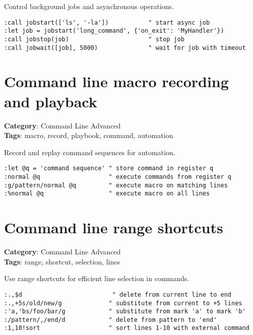 {{{{Control background jobs and asynchronous operations.

\begin{Exa*}{}
\begin{Verbatim}[fontsize=\footnotesize, breaklines, breakanywhere]
:call jobstart(['ls', '-la'])           " start async job
:let job = jobstart('long_command', {'on_exit': 'MyHandler'})
:call jobstop(job)                      " stop job
:call jobwait([job], 5000)              " wait for job with timeout
\end{Verbatim}
\end{Exa*}

\section{Command line macro recording and playback}

\textbf{Category}: Command Line Advanced\\ \textbf{Tags}: macro, record, playbook, command, automation
\vspace{0.5cm}

Record and replay command sequences for automation.

\begin{Exa*}{}
\begin{Verbatim}[fontsize=\footnotesize, breaklines, breakanywhere]
:let @q = 'command sequence' " store command in register q
:normal @q                   " execute commands from register q
:g/pattern/normal @q         " execute macro on matching lines
:%normal @q                  " execute macro on all lines
\end{Verbatim}
\end{Exa*}

\section{Command line range shortcuts}

\textbf{Category}: Command Line Advanced\\ \textbf{Tags}: range, shortcut, selection, lines
\vspace{0.5cm}

Use range shortcuts for efficient line selection in commands.

\begin{Exa*}{}
\begin{Verbatim}[fontsize=\footnotesize, breaklines, breakanywhere]
:.,$d                         " delete from current line to end
:.,+5s/old/new/g             " substitute from current to +5 lines
:'a,'bs/foo/bar/g            " substitute from mark 'a' to mark 'b'
:/pattern/,/end/d            " delete from pattern to 'end'
:1,10!sort                   " sort lines 1-10 with external command
\end{Verbatim}
\end{Exa*}

}}}}
